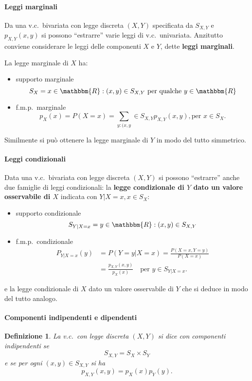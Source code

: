 \documentclass[11pt,a4paper,twoside]{article}
\newtheorem{definition}{Definizione}
\newcommand\R{\mathbbm{R}}
\begin{document}
\paragraph{Leggi marginali}
Da una v.c.\ bivariata con legge discreta \((X,Y)\) specificata da
\(S_{X,Y}\) e \(p_{X,Y}(x, y)\) si possono ``estrarre'' varie leggi di
v.c.\ univariata. Anzitutto conviene considerare le leggi delle
componenti \(X\) e \(Y\), dette \textbf{leggi marginali}.

La legge marginale di \(X\) ha:
\begin{itemize}
\item supporto marginale
  \[ S_X = {x\in\R : (x,y) \in S_{X,Y}\mbox{ per qualche } y\in\R} \]
\item f.m.p.\ marginale
  \[
    p_X(x) = P(X=x) = \sum_{y:(x,y}\in S_{X,Y} p_{X,Y}(x,y), \mbox{
      per } x\in S_X .
  \]
\end{itemize}

Similmente si può ottenere la legge marginale di \(Y\) in modo del
tutto simmetrico.

\paragraph{Leggi condizionali}
Data una v.c.\ bivariata con legge discreta \((X,Y)\) si possono
``estrarre'' anche due famiglie di leggi condizionali: la
\textbf{legge condizionale di \(Y\) dato un valore osservabile di
  \(X\)} indicata con \(Y|X=x, x\in S_X\):
\begin{itemize}
\item supporto condizionale
  \[ S_{Y|X=x} = { y\in\R : (x,y) \in S_{X,Y} } \]
\item f.m.p.\ condizionale
  \begin{align*}
      P_{Y|X=x}(y) &= P(Y=y| X=x) = \frac{P(X=x, Y=y)}{P(X=x)} \\
                   &= \frac{p_{X,Y}(x,y)}{p_X(x)} \quad\mbox{per } y\in S_{Y|X=x} .
  \end{align*}
\end{itemize}
e la legge condizionale di \(X\) dato un valore osservabile di \(Y\)
che si deduce in modo del tutto analogo.

\paragraph{Componenti indipendenti e dipendenti}
\begin{definition}
  La v.c.\ con legge discreta \((X,Y)\) si dice con componenti
  indipendenti se
  \[ S_{X,Y} = S_X \times S_Y \]
  e se per ogni \((x,y)\in S_{X,Y}\) si ha
  \[ p_{X,Y}(x,y) = p_X(x) p_Y(y) . \]
\end{definition}
\end{document}
